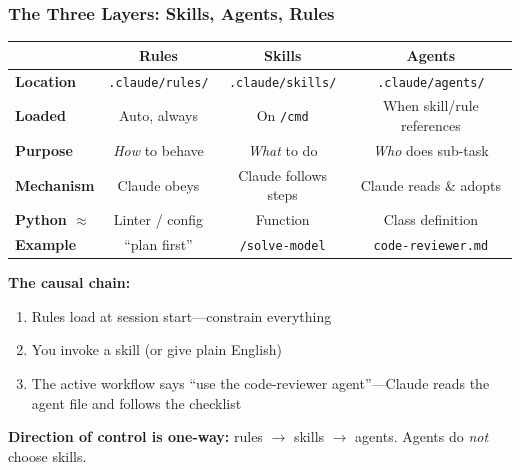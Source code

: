 \documentclass[10pt,english,aspectratio=169]{beamer}
\begin{document}
\begin{frame}
\frametitle{The Three Layers: Skills, Agents, Rules}

\begin{center}
\small
\begin{tabular}{|l|c|c|c|}
\hline
& \textbf{Rules} & \textbf{Skills} & \textbf{Agents} \\ \hline
\textbf{Location} & \texttt{.claude/rules/} & \texttt{.claude/skills/} & \texttt{.claude/agents/} \\ \hline
\textbf{Loaded} & Auto, always & On \texttt{/cmd} & When skill/rule references \\ \hline
\textbf{Purpose} & \textit{How} to behave & \textit{What} to do & \textit{Who} does sub-task \\ \hline
\textbf{Mechanism} & Claude obeys & Claude follows steps & Claude reads \& adopts \\ \hline
\textbf{Python $\approx$} & Linter / config & Function & Class definition \\ \hline
\textbf{Example} & ``plan first'' & \texttt{/solve-model} & \texttt{code-reviewer.md} \\ \hline
\end{tabular}
\end{center}

\vspace{0.3cm}

\textbf{The causal chain:}
\begin{enumerate}
    \item Rules load at session start---constrain everything
    \item You invoke a skill (or give plain English)
    \item The active workflow says ``use the code-reviewer agent''---Claude reads the agent file and follows the checklist
\end{enumerate}

\vspace{0.1cm}

\textbf{Direction of control is one-way:} rules $\to$ skills $\to$ agents. Agents do \textit{not} choose skills.
\end{frame}
\end{document}
